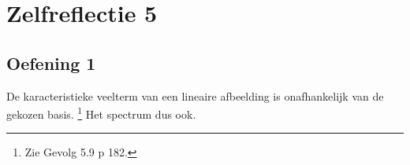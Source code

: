 \documentclass[lineaire_algebra_oplossingen.tex]{subfiles}
\begin{document}
\section{Zelfreflectie 5}
\subsection{Oefening 1}
De karacteristieke veelterm van een lineaire afbeelding is onafhankelijk van de gekozen basis. \footnote{Zie Gevolg 5.9 p 182.}
Het spectrum dus ook.
\end{document}
